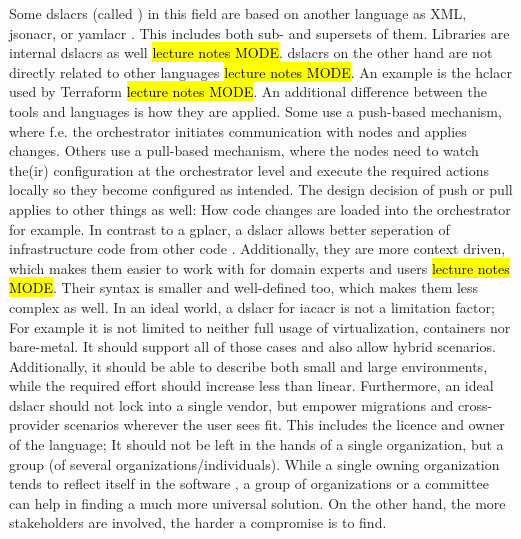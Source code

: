 \newline
Some \gls{dslacr}s (called ) in this field are based on another language as XML, \gls{jsonacr}, or \gls{yamlacr} \cite{iac_oreilly}. This includes both sub- and supersets of them. Libraries are internal \gls{dslacr}s as well \hl{lecture notes MODE}.  \gls{dslacr}s on the other hand are not directly related to other languages \hl{lecture notes MODE}. An example is the \gls{hclacr} used by Terraform \cite{iac_oreilly} \hl{lecture notes MODE}.
\newline
An additional difference between the tools and languages is how they are applied. Some use a push-based mechanism, where f.e. the orchestrator initiates communication with nodes and applies changes. Others use a pull-based mechanism, where the nodes need to watch the(ir) configuration at the orchestrator level and execute the required actions locally so they become configured as intended. The design decision of push or pull applies to other things as well: How code changes are loaded into the orchestrator for example.
\newline
In contrast to a \gls{gplacr}, a \gls{dslacr} allows better seperation of infrastructure code from other code \cite{dsl_slides}. Additionally, they are more context driven, which makes them easier to work with for domain experts and users \hl{lecture notes MODE}. Their syntax is smaller and well-defined too, which makes them less complex as well.
\newline
In an ideal world, a \gls{dslacr} for \gls{iacacr} is not a limitation factor; For example it is not limited to neither full usage of virtualization, containers nor bare-metal. It should support all of those cases and also allow hybrid scenarios. Additionally, it should be able to describe both small and large environments, while the required effort should increase less than linear. Furthermore, an ideal \gls{dslacr} should not lock into a single vendor, but empower migrations and cross-provider scenarios wherever the user sees fit. This includes the licence and owner of the language; It should not be left in the hands of a single organization, but a group (of several organizations/individuals). While a single owning organization tends to reflect itself in the software \cite{conways_law}, a group of organizations or a committee can help in finding a much more universal solution. On the other hand, the more stakeholders are involved, the harder a compromise is to find.


